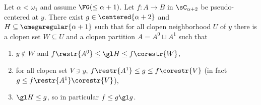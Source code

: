 \begin{theorem}\label{VerticalTheorem}
Let $\alpha<\omega_1$ and assume $\FG(\leq\alpha+1)$.
Let $f:A\to B$ in $\sC_{\alpha+2}$ be pseudo-centered at $y$.
There exist $g\in\centered{\alpha+2}$ and $H\subseteq \omegaregular{\alpha+1}$ such that
for all clopen neighborhood $U$ of $y$ there is a clopen set $W\subseteq U$ and a clopen partition $A=A^0\sqcup A^1$ such that 
\begin{enumerate}
\item $y\notin W$ and $f\restr{A^0}\leq \gl H \leq f\corestr{W}$,
\item for all clopen set $V\ni y$, $f\restr{A^1}\leq g \leq f\corestr{V}$ (in fact  $g \leq f\restr{A^1}\corestr{V}$),
\item $\gl H\leq g$, so in particular $f\leq g\gl g$.
\end{enumerate}
\end{theorem}

